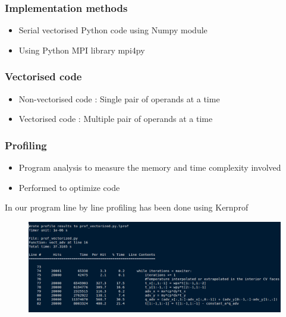 \documentclass{beamer}
\begin{document}

\begin{frame}
\frametitle{Implementation methods}
\begin{itemize}
\item Serial vectorised Python code using Numpy module
\item Using Python MPI library mpi4py
\end{itemize}
\end{frame}


\begin{frame}
\frametitle{Vectorised code}
\begin{itemize}
\item Non-vectorised code : Single pair of operands at a time
\item Vectorised code : Multiple pair of operands at a time
\end{itemize}
\end{frame}

\begin{frame}
\frametitle{Profiling}
\begin{itemize}
\item Program analysis to measure the memory and time complexity involved
\item Performed to optimize code
\end{itemize}%
\pause
In our program line by line profiling has been done using Kernprof
\begin{figure}
\centering
\includegraphics[width=1.0\textwidth]{profile}
\end{figure}
\end{frame}
\end{document}
